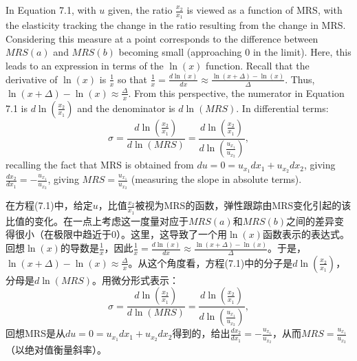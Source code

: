 \begin{original}
In Equation 7.1, with $u$ given, the ratio $\frac{x_2}{x_1}$ is viewed as a function of MRS, with the elasticity tracking the change in the ratio resulting from the change in MRS. Considering this measure at a point corresponds to the difference between $MRS(a)$ and $MRS(b)$ becoming small (approaching 0 in the limit). Here, this leads to an expression in terms of the $\ln(x)$ function. Recall that the derivative of $\ln(x)$ is $\frac{1}{x}$ so that $\frac{1}{x} = \frac{d\ln(x)}{dx} \approx \frac{\ln(x+\Delta) - \ln(x)}{\Delta}$. Thus, $\ln(x+\Delta) - \ln(x) \approx \frac{\Delta}{x}$. From this perspective, the numerator in Equation 7.1 is $d\ln\!\left(\frac{x_2}{x_1}\right)$ and the denominator is $d\ln(MRS)$. In differential terms:
\[
\sigma = \frac{d\ln\!\left(\frac{x_2}{x_1}\right)}{d\ln(MRS)} = \frac{d\ln\!\left(\frac{x_2}{x_1}\right)}{d\ln\!\left(\frac{u_{x_1}}{u_{x_2}}\right)}, \tag{7.2}
\]
recalling the fact that MRS is obtained from $du = 0 = u_{x_1} dx_1 + u_{x_2} dx_2$, giving $\frac{dx_2}{dx_1} = -\frac{u_{x_1}}{u_{x_2}}$, giving $MRS = \frac{u_{x_1}}{u_{x_2}}$ (measuring the slope in absolute terms).
\end{original}
\begin{translation}
在方程(7.1)中，给定$u$，比值$\frac{x_2}{x_1}$被视为MRS的函数，弹性跟踪由MRS变化引起的该比值的变化。在一点上考虑这一度量对应于$MRS(a)$和$MRS(b)$之间的差异变得很小（在极限中趋近于0）。这里，这导致了一个用$\ln(x)$函数表示的表达式。回想$\ln(x)$的导数是$\frac{1}{x}$，因此$\frac{1}{x} = \frac{d\ln(x)}{dx} \approx \frac{\ln(x+\Delta) - \ln(x)}{\Delta}$。于是，$\ln(x+\Delta) - \ln(x) \approx \frac{\Delta}{x}$。从这个角度看，方程(7.1)中的分子是$d\ln\!\left(\frac{x_2}{x_1}\right)$，分母是$d\ln(MRS)$。用微分形式表示：
\[
\sigma = \frac{d\ln\!\left(\frac{x_2}{x_1}\right)}{d\ln(MRS)} = \frac{d\ln\!\left(\frac{x_2}{x_1}\right)}{d\ln\!\left(\frac{u_{x_1}}{u_{x_2}}\right)}, \tag{7.2}
\]
回想MRS是从$du = 0 = u_{x_1} dx_1 + u_{x_2} dx_2$得到的，给出$\frac{dx_2}{dx_1} = -\frac{u_{x_1}}{u_{x_2}}$，从而$MRS = \frac{u_{x_1}}{u_{x_2}}$（以绝对值衡量斜率）。
\end{translation}

